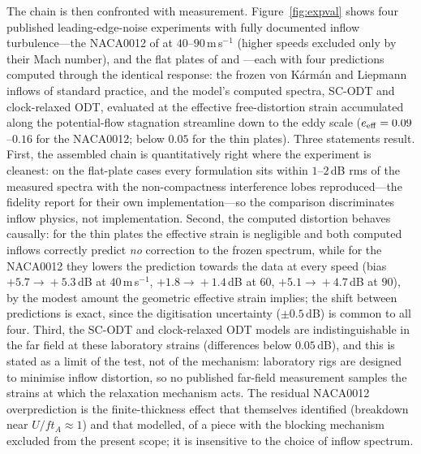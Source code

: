 \documentclass[lineno]{JFM-FLM_Au}
\begin{document}
The chain is then confronted with measurement.
Figure~\ref{fig:expval} shows four published leading-edge-noise
experiments with fully documented inflow turbulence---the NACA0012 of
\citet{PatersonAmiet1976} at $40$--$90$\,m\,s$^{-1}$ (higher speeds
excluded only by their Mach number), and the flat plates of
\citet{Bampanis2022} and \citet{Narayanan2015}---each with four
predictions computed through the identical response: the frozen
von K\'arm\'an and Liepmann inflows of standard practice, and the
model's computed spectra, SC-ODT and clock-relaxed ODT, evaluated at the
effective free-distortion strain accumulated along the potential-flow
stagnation streamline down to the eddy scale ($e_{\rm eff}=0.09$--$0.16$
for the NACA0012; below $0.05$ for the thin plates). Three statements
result. First, the assembled chain is quantitatively right where the
experiment is cleanest: on the flat-plate cases every formulation sits
within $1$--$2$\,dB rms of the measured spectra with the
non-compactness interference lobes reproduced---the fidelity
\citet{Bampanis2022} report for their own implementation---so the
comparison discriminates inflow physics, not implementation. Second,
the computed distortion behaves causally: for the thin plates the
effective strain is negligible and both computed inflows correctly predict \emph{no} correction to the frozen spectrum, while for the NACA0012 they
lowers the prediction towards the data at every speed
(bias $+5.7\!\to\!+5.3$\,dB at $40$\,m\,s$^{-1}$,
$+1.8\!\to\!+1.4$\,dB at $60$, $+5.1\!\to\!+4.7$\,dB at $90$), by the
modest amount the geometric effective strain implies; the shift
between predictions is exact, since the digitisation uncertainty
($\pm0.5$\,dB) is common to all four. Third, the
SC-ODT and clock-relaxed ODT models are indistinguishable in the far
field at these laboratory strains (differences below $0.05$\,dB),
and this is stated as a limit of the test, not of the mechanism:
laboratory rigs are designed to minimise inflow distortion, so no
published far-field measurement samples the strains at which the
relaxation mechanism acts. The residual NACA0012 overprediction is
the finite-thickness effect that \citet{PatersonAmiet1976} themselves
identified (breakdown near $U/f t_A\approx1$) and
that \citet{Gershfeld2004} modelled, of a piece with the blocking mechanism
excluded from the present scope; it is insensitive to the choice
of inflow spectrum.
\end{document}
